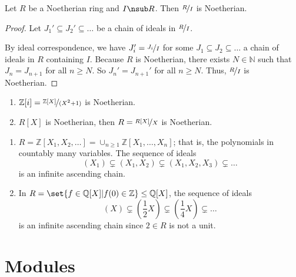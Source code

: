 \begin{lemma}{}{}
    Let \(R\) be a Noetherian ring and \(I \nsub R\). Then \(\nicefrac{R}{I}\) is Noetherian.
\end{lemma}
\begin{proof}
    Let \(J_1' \subseteq J_2' \subseteq \dots\) be a chain of ideals in \(\nicefrac{R}{I}\).

    By ideal correspondence, we have \(J_i' = \nicefrac{J_i}{I}\) for some \(J_1 \subseteq J_2 \subseteq \dots\) a chain of ideals in \(R\) containing \(I\). Because \(R\) is Noetherian, there exists \(N \in \mathbb{N}\) such that \(J_n = J_{n+1}\) for all \(n \geq  N\). So \(J_n' = J_{n+1}'\) for all \(n \geq N\). Thus, \(\nicefrac{R}{I}\) is Noetherian.
\end{proof}
\begin{example}
    \begin{enumerate}
        \item \(\mathbb{Z}[i] = \nicefrac{\mathbb{Z}[X]}{(X^2 + 1)}\) is Noetherian.
        \item \(R[X]\) is Noetherian, then \(R = \nicefrac{R[X]}{X}\) is Noetherian.
    \end{enumerate}
\end{example}
\begin{example}
    \leavevmode
    \begin{enumerate}
        \item \(R = \mathbb{Z}[X_1, X_2, \dots] = \cup_{n \geq 1} \mathbb{Z}[X_1, \dots, X_n]\); that is, the polynomials in countably many variables. The sequence of ideals
        \[
            (X_1) \subsetneq (X_1, X_2) \subsetneq (X_1, X_2, X_3) \subsetneq \dots
        \]
        is an infinite ascending chain.
        \item In \(R = \set{f \in \mathbb{Q}[X] | f(0) \in \mathbb{Z}} \leq \mathbb{Q}[X]\), the sequence of ideals
        \[
            (X) \subsetneq (\frac{1}{2} X) \subsetneq (\frac{1}{4} X) \subsetneq \dots
        \]
        is an infinite ascending chain since \(2 \in R\) is not a unit.
    \end{enumerate}
\end{example}
\section{Modules}

